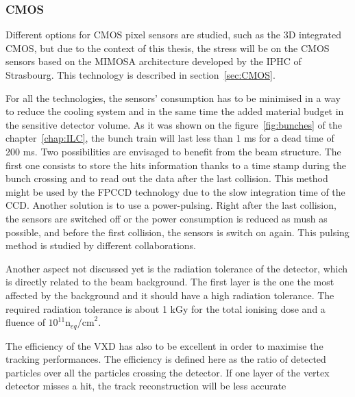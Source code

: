    \subsubsection{CMOS}

   Different options for \gls{CMOS} pixel sensors are studied, such as the 3D integrated \gls{CMOS}, but due to the context of this thesis, the stress will be on the \gls{CMOS} sensors based on the \gls{MIMOSA} architecture developed by the IPHC of Strasbourg. 
   This technology is described in section~\ref{sec:CMOS}.

   For all the technologies, the sensors' consumption has to be minimised in a way to reduce the cooling system and in the same time the added material budget in the sensitive detector volume.
   As it was shown on the figure~\ref{fig:bunches} of the chapter~\ref{chap:ILC}, the bunch train will last less than 1 ms for a dead time of 200 ms.
   Two possibilities are envisaged to benefit from the beam structure.
   The first one consists to store the hits information thanks to a time stamp during the bunch crossing and to read out the data after the last collision.
   This method might be used by the \gls{FPCCD} technology due to the slow integration time of the \gls{CCD}.
   Another solution is to use a power-pulsing.
   Right after the last collision, the sensors are switched off or the power consumption is reduced as mush as possible, and before the first collision, the sensors is switch on again.
   This pulsing method is studied by different collaborations. 
   
   Another aspect not discussed yet is the radiation tolerance of the detector, which is directly related to the beam background.
   The first layer is the one the most affected by the background and it should have a high radiation tolerance. 
   The required radiation tolerance is about 1 kGy for the total ionising dose and a fluence of $10^{11}\text{n}_{eq}\text{/cm}^2$\cite{Behnke2013}.

   The efficiency of the \gls{VXD} has also to be excellent in order to maximise the tracking performances.
   The efficiency is defined here as the ratio of detected particles over all the particles crossing the detector.
   If one layer of the vertex detector misses a hit, the track reconstruction will be less accurate 
   

